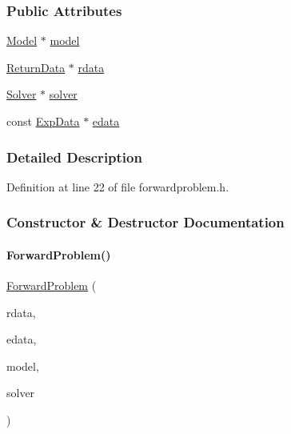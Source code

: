 \subsubsection*{Public Attributes}
\begin{DoxyCompactItemize}
\item 
\mbox{\hyperlink{classamici_1_1_model}{Model}} $\ast$ \mbox{\hyperlink{classamici_1_1_forward_problem_a7b56c3ca57dde73bdbc8dbe9772bca19}{model}}
\item 
\mbox{\hyperlink{classamici_1_1_return_data}{Return\+Data}} $\ast$ \mbox{\hyperlink{classamici_1_1_forward_problem_a4c0807651f0594a186e8856f22e442cc}{rdata}}
\item 
\mbox{\hyperlink{classamici_1_1_solver}{Solver}} $\ast$ \mbox{\hyperlink{classamici_1_1_forward_problem_ae1ad25a4dd6b076c27672dc94d11dad0}{solver}}
\item 
const \mbox{\hyperlink{classamici_1_1_exp_data}{Exp\+Data}} $\ast$ \mbox{\hyperlink{classamici_1_1_forward_problem_a9ec6aee8cd7c91d0e49aed6e3d0db4ce}{edata}}
\end{DoxyCompactItemize}


\subsubsection{Detailed Description}


Definition at line 22 of file forwardproblem.\+h.



\subsubsection{Constructor \& Destructor Documentation}
\mbox{\label{classamici_1_1_forward_problem_a315030da8410dce7baa8eb1dd630994b}} 
\paragraph{\texorpdfstring{ForwardProblem()}{ForwardProblem()}}
{\footnotesize\ttfamily \mbox{\hyperlink{classamici_1_1_forward_problem}{Forward\+Problem}} (\begin{DoxyParamCaption}\item[{\mbox{\hyperlink{classamici_1_1_return_data}{Return\+Data}} $\ast$}]{rdata,  }\item[{const \mbox{\hyperlink{classamici_1_1_exp_data}{Exp\+Data}} $\ast$}]{edata,  }\item[{\mbox{\hyperlink{classamici_1_1_model}{Model}} $\ast$}]{model,  }\item[{\mbox{\hyperlink{classamici_1_1_solver}{Solver}} $\ast$}]{solver }\end{DoxyParamCaption})}



